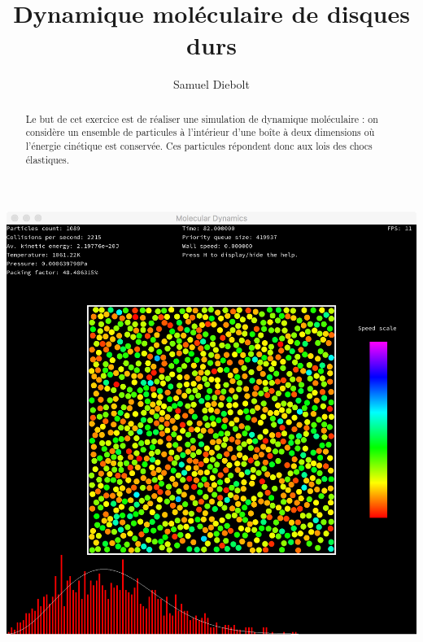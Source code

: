 \documentclass{tufte-handout}
\title{Dynamique moléculaire de disques durs}
\author{Samuel Diebolt}
\begin{document}
  \maketitle

  \begin{marginfigure}%
    \includegraphics[width=\linewidth]{figures/cover.png}
  \end{marginfigure}

  \begin{abstract}
    Le but de cet exercice est de réaliser une simulation de dynamique moléculaire : on considère un ensemble de particules à l'intérieur d'une boîte à deux dimensions où l'énergie cinétique est conservée. Ces particules répondent donc aux lois des chocs élastiques.
  \end{abstract}
\end{document}
